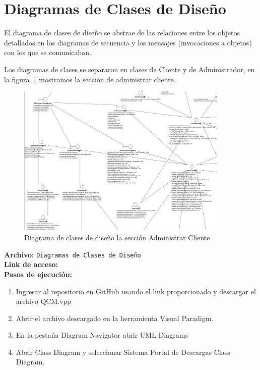 \section{Diagramas de Clases de Diseño}

El diagrama de clases de diseño se abstrae de las relaciones entre los objetos detallados en los diagramas de secuencia y los mensajes (invocaciones a objetos) con los que se comunicaban.

Los diagramas de clases se separaron en clases de Cliente y de Administrador, en la figura~\ref{fig:DiaramaCasoDeDisenio} mostramos la sección de administrar cliente.

\begin{figure}[H]
    \centering
    \includegraphics[width=0.9\textwidth]{Media/4_Disenio/DCAdmin.png}
    \caption{Diagrama de clases de diseño la sección Administrar Cliente} 
    \label{fig:DiaramaCasoDeDisenio}
\end{figure}

\textbf{Archivo:} \texttt{Diagramas de Clases de Diseño} \\
\textbf{Link de acceso:} \linkDiagramaClases \\

\textbf{Pasos de ejecución:}
\begin{enumerate}
    \item Ingresar al repositorio en GitHub usando el link proporcionado y descargar el archivo QCM.vpp
    \item Abrir el archivo descargado en la herramienta Visual Paradigm.
    \item En la pestaña Diagram Navigator abrir UML Diagrams
    \item Abrir Class Diagram y seleccionar Sistema Portal de Descargas Class Diagram.
\end{enumerate}

